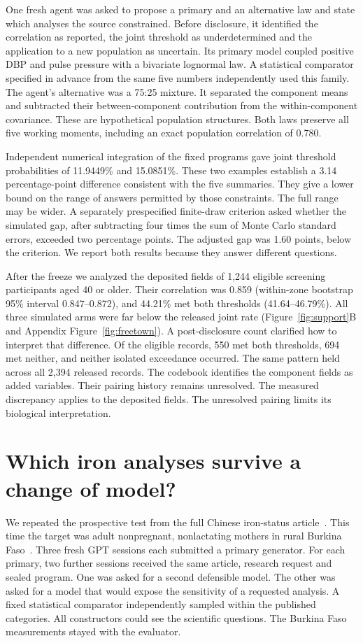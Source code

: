 \documentclass[sigconf,anonymous,review]{acmart}
\begin{document}
One fresh agent was asked to propose a primary and an alternative law and state which analyses the source constrained. Before disclosure, it identified the correlation as reported, the joint threshold as underdetermined and the application to a new population as uncertain. Its primary model coupled positive DBP and pulse pressure with a bivariate lognormal law. A statistical comparator specified in advance from the same five numbers independently used this family. The agent's alternative was a 75:25 mixture. It separated the component means and subtracted their between-component contribution from the within-component covariance. These are hypothetical population structures. Both laws preserve all five working moments, including an exact population correlation of 0.780.

Independent numerical integration of the fixed programs gave joint threshold probabilities of 11.9449\% and 15.0851\%. These two examples establish a 3.14 percentage-point difference consistent with the five summaries. They give a lower bound on the range of answers permitted by those constraints. The full range may be wider. A separately prespecified finite-draw criterion asked whether the simulated gap, after subtracting four times the sum of Monte Carlo standard errors, exceeded two percentage points. The adjusted gap was 1.60 points, below the criterion. We report both results because they answer different questions.

After the freeze we analyzed the deposited fields of 1,244 eligible screening participants aged 40 or older. Their correlation was 0.859 (within-zone bootstrap 95\% interval 0.847--0.872), and 44.21\% met both thresholds (41.64--46.79\%). All three simulated arms were far below the released joint rate (Figure~\ref{fig:support}B and Appendix Figure~\ref{fig:freetown}). A post-disclosure count clarified how to interpret that difference. Of the eligible records, 550 met both thresholds, 694 met neither, and neither isolated exceedance occurred. The same pattern held across all 2,394 released records. The codebook identifies the component fields as added variables. Their pairing history remains unresolved. The measured discrepancy applies to the deposited fields. The unresolved pairing limits its biological interpretation.


\section{Which iron analyses survive a change of model?}
\label{sec:ironpros}
We repeated the prospective test from the full Chinese iron-status article~\cite{zhu}. This time the target was adult nonpregnant, nonlactating mothers in rural Burkina Faso~\cite{burkina_iron}. Three fresh GPT sessions each submitted a primary generator. For each primary, two further sessions received the same article, research request and sealed program. One was asked for a second defensible model. The other was asked for a model that would expose the sensitivity of a requested analysis. A fixed statistical comparator independently sampled within the published categories. All constructors could see the scientific questions. The Burkina Faso measurements stayed with the evaluator.
\end{document}
